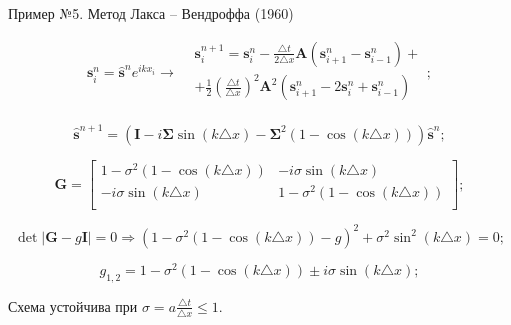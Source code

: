 \documentclass[10pt,xcolor=pst,aspectratio=169]{beamer}
\begin{document}
\begin{frame}{Пример №5. Метод Лакса -- Вендроффа (1960)}

    \transdissolve[duration=0.1]
    \justifying
    \large

    \[
        \boxed{
        \mathbf{s}^{n}_{i}
        =
        \hat{\mathbf{s}}^{n} e^{i k x_{i}}
        }
        \rightarrow
        \boxed{
        \begin{split}
            &\mathbf{s}^{n + 1}_{i}
            =
            \mathbf{s}^{n}_{i}
            - \frac{\triangle t}{2 \triangle x} \mathbf{A} \left( \mathbf{s}^{n}_{i + 1} - \mathbf{s}^{n}_{i - 1} \right) + \\
            &+ \frac{1}{2}\left( \frac{\triangle t}{\triangle x} \right)^{2} \mathbf{A}^{2} \left( \mathbf{s}^{n}_{i + 1} - 2 \mathbf{s}^{n}_{i} + \mathbf{s}^{n}_{i - 1} \right) \\
        \end{split}
        };
    \]

    \[
        \hat{\mathbf{s}}^{n + 1}
        =
        \boxed{\left( \mathbf{I} - i \bm{\Sigma} \sin{ \left( k \triangle x \right) } - \bm{\Sigma}^{2} \left( 1 - \cos{ \left( k \triangle x \right) } \right) \right)} \hat{\mathbf{s}}^{n};
    \]

    \[
        \mathbf{G}
        =
        \begin{bmatrix}
           1 - \sigma^{2} \left( 1 - \cos{ \left( k \triangle x \right) } \right) & - i \sigma \sin{ \left( k \triangle x \right) } \\
           - i \sigma \sin{ \left( k \triangle x \right) } & 1 - \sigma^{2} \left( 1 - \cos{ \left( k \triangle x \right) } \right) \\
        \end{bmatrix};
    \]

    \[
        \det \left| \mathbf{G} - g \mathbf{I} \right| = 0
        \Rightarrow
        \left( 1 - \sigma^{2} \left( 1 - \cos{ \left( k \triangle x \right) } \right) - g \right)^{2} + \sigma^{2} \sin^{2}{ \left( k \triangle x \right) } = 0;
    \]

    \[
        g_{1,2} = 1 - \sigma^{2} \left( 1 - \cos{ \left( k \triangle x \right) } \right) \pm i \sigma \sin{ \left( k \triangle x \right) };
    \]

    \begin{center}
        Схема устойчива при $\sigma = a \frac{\triangle t}{\triangle x} \leq 1$.
    \end{center}

\end{frame}
\end{document}
